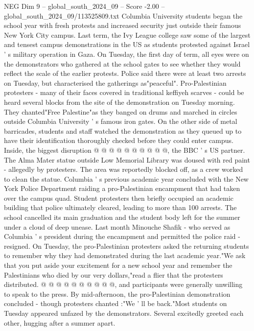 \begin{textsample}{NEG Dim 9 – global\_south\_2024\_09 – Score -2.00 – global\_south\_2024\_09/113525809.txt}  \label{ex:f9_neg_197}
Columbia University students began the school year with fresh protests and increased security just outside their famous New York City campus.
Last term, the Ivy League college saw some of the largest and tensest campus demonstrations in the US as students protested against Israel ' s military operation in Gaza.
On Tuesday, the first day of term, all eyes were on the demonstrators who gathered at the school gates to see whether they would reflect the scale of the earlier protests.
Police said there were at least two arrests on Tuesday, but characterised the gatherings as"peaceful".
Pro-Palestinian protesters - many of their faces covered in traditional keffiyeh scarves - could be heard several blocks from the site of the demonstration on Tuesday morning.
They chanted"Free Palestine"as they banged on drums and marched in circles outside Columbia University ' s famous iron gates.
On the other side of metal barricades, students and staff watched the demonstration as they queued up to have their identification thoroughly checked before they could enter campus.
Inside, the biggest disruption @ @ @ @ @ @ @ @ @ @, the BBC ' s US partner.
The Alma Mater statue outside Low Memorial Library was doused with red paint - allegedly by protesters.
The area was reportedly blocked off, as a crew worked to clean the statue.
Columbia ' s previous academic year concluded with the New York Police Department raiding a pro-Palestinian encampment that had taken over the campus quad.
Student protesters then briefly occupied an academic building that police ultimately cleared, leading to more than 100 arrests.
The school cancelled its main graduation and the student body left for the summer under a cloud of deep unease.
Last month Minouche Shafik - who served as Columbia ' s president during the encampment and permitted the police raid - resigned.
On Tuesday, the pro-Palestinian protesters asked the returning students to remember why they had demonstrated during the last academic year."We ask that you put aside your excitement for a new school year and remember the Palestinians who died by our very dollars,"read a flier that the protesters distributed. @ @ @ @ @ @ @ @ @ @, and participants were generally unwilling to speak to the press.
By mid-afternoon, the pro-Palestinian demonstration concluded - though protesters chanted :"We ' ll be back."Most students on Tuesday appeared unfazed by the demonstrators.
Several excitedly greeted each other, hugging after a summer apart.

\end{textsample}
